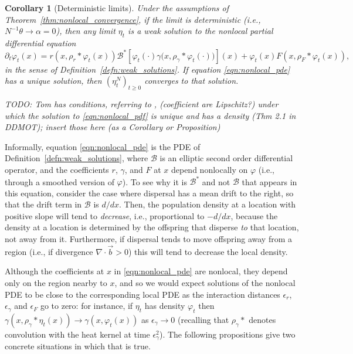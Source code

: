 \documentclass[12pt]{article}
\newtheorem{corollary}[theorem]{Corollary}
\newcommand{\grad}{\nabla}
\newcommand{\DG}{\mathcal{B}}  %
\newcommand{\meanq}{\vec b}    %
\newcommand{\kernel}{\rho}  %
\newcommand{\smooth}[1]{\kernel_{#1} \! * \!}  %
\newcommand{\comment}[1]{{\color{blue} \it #1}}
\begin{document}
\begin{corollary}[Deterministic limits]
    \label{cor:nonlocal_pde_limits}
    Under the assumptions of Theorem~\ref{thm:nonlocal_convergence},
    if the limit is deterministic (i.e., $N^{-1}\theta \to \alpha = 0$),
    then any limit $\eta_t$ is a weak solution to the nonlocal partial differential equation
    \begin{equation} \label{eqn:nonlocal_pde}
        \partial_t \varphi_t(x)
        =
        r\left(x, \smooth{r} \varphi_t(x) \right)
        \DG^* \left[
            \varphi_t(\cdot)
            \gamma\big( x, \smooth{\gamma} \varphi_t(\cdot) \big)
        \right](x)
        +
        \varphi_t(x)
        F\left(x, \smooth{F} \varphi_t(x) \right)
        ,
    \end{equation}
    in the sense of Definition~\ref{defn:weak_solutions}.
    If equation \eqref{eqn:nonlocal_pde} has a unique solution,
    then $(\eta^N_t)_{t \ge 0}$ converges to that solution.
\end{corollary}

\comment{TODO: Tom has conditions, referring to \citet{KURTZ1999103}, (coefficient are Lipschitz?) under which
    the solution to \eqref{eqn:nonlocal_pdf} is unique and has a density (Thm 2.1 in DDMOT);
    insert those here (as a Corollary or Proposition)}

Informally, equation \eqref{eqn:nonlocal_pde} is the PDE of Definition~\ref{defn:weak_solutions},
where $\DG$ is an elliptic second order differential operator,
and the coefficients $r$, $\gamma$, and $F$
at $x$ depend nonlocally on $\varphi$
(i.e., through a smoothed version of $\varphi$).
To see why it is $\DG^*$ and not $\DG$ that appears in this equation,
consider the case where dispersal has a mean drift to the right,
so that the drift term in $\DG$ is $d/dx$.
Then, the population density at a location with positive slope
will tend to \emph{decrease}, i.e., proportional to $-d/dx$,
because the density at a location is determined by the offspring that disperse \emph{to}
that location, not away from it.
Furthermore, if dispersal tends to move offspring away from a region
(i.e., if divergence $\grad \cdot \meanq > 0$)
this will tend to decrease the local density.

Although the coefficients at $x$ in \eqref{eqn:nonlocal_pde} are nonlocal,
they depend only on the region nearby to $x$,
and so we would expect solutions of the nonlocal PDE to be close to the corresponding local PDE
as the interaction distances $\epsilon_r$, $\epsilon_\gamma$ and $\epsilon_F$
go to zero:
for instance, if $\eta_t$ has density $\varphi_t$
then $\gamma(x, \smooth{\gamma} \eta_t(x)) \to \gamma(x, \varphi_t(x))$ as $\epsilon_\gamma \to 0$
(recalling that $\smooth{\gamma}{}$ denotes convolution with the heat kernel at time $\epsilon_\gamma^2$).
The following propositions give two concrete situations in which that is true.
\end{document}
